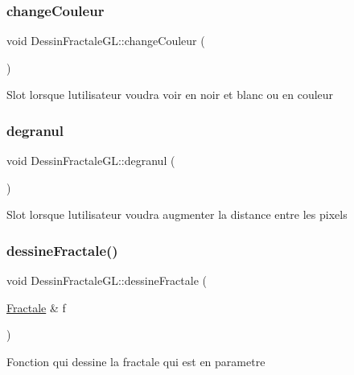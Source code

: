 \subsubsection{\texorpdfstring{change\+Couleur}{changeCouleur}}
{\footnotesize\ttfamily void Dessin\+Fractale\+G\+L\+::change\+Couleur (\begin{DoxyParamCaption}{ }\end{DoxyParamCaption})\hspace{0.3cm}{\ttfamily [slot]}}

Slot lorsque l\textquotesingle{}utilisateur voudra voir en noir et blanc ou en couleur \mbox{\label{classDessinFractaleGL_ae07214922c9675f6b0a0da825f85bb1d}} 
\subsubsection{\texorpdfstring{degranul}{degranul}}
{\footnotesize\ttfamily void Dessin\+Fractale\+G\+L\+::degranul (\begin{DoxyParamCaption}{ }\end{DoxyParamCaption})\hspace{0.3cm}{\ttfamily [slot]}}

Slot lorsque l\textquotesingle{}utilisateur voudra augmenter la distance entre les pixels \mbox{\label{classDessinFractaleGL_afe2be363c25420aec109c83890dade6e}} 
\subsubsection{\texorpdfstring{dessine\+Fractale()}{dessineFractale()}}
{\footnotesize\ttfamily void Dessin\+Fractale\+G\+L\+::dessine\+Fractale (\begin{DoxyParamCaption}\item[{\hyperlink{classFractale}{Fractale} \&}]{f }\end{DoxyParamCaption})}

Fonction qui dessine la fractale qui est en parametre \mbox{\label{classDessinFractaleGL_a3f2cb057946af75ae1bb887e984c5a02}} 
